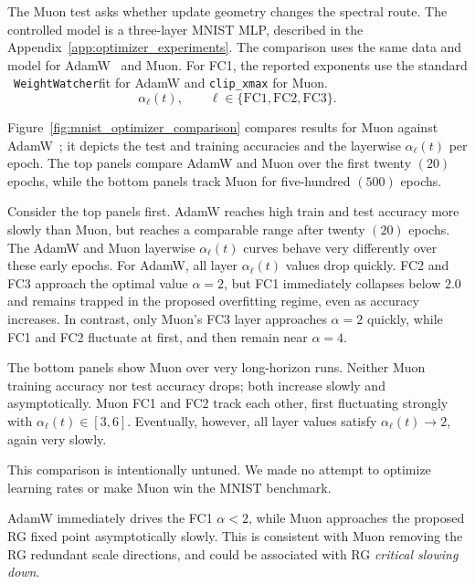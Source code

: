\documentclass[10pt,twocolumn]{article}
\newcommand{\WW}{\texttt{WeightWatcher}}
\begin{document}
The Muon test asks whether update geometry changes the spectral route.  The controlled model is a three-layer MNIST MLP, described
in the Appendix~\ref{app:optimizer_experiments}.
The comparison uses the same data and model for AdamW~\cite{LoshchilovHutter2019} and Muon.
For FC1, the reported exponents use the standard ~\WW fit for AdamW and \texttt{clip\_xmax} for Muon.
\begin{equation}
        \alpha_\ell(t),
        \qquad
        \ell\in\{\mathrm{FC1},\mathrm{FC2},\mathrm{FC3}\}.
\end{equation}


Figure~\ref{fig:mnist_optimizer_comparison} compares results for Muon against AdamW~\cite{LoshchilovHutter2019};
it depicts the test and training accuracies and the layerwise $\alpha_{\ell}(t)$ per epoch.
The top panels compare AdamW and Muon over the first twenty $(20)$ epochs, while the bottom panels
track Muon for five-hundred $(500)$ epochs.

Consider the top panels first.
AdamW reaches high train and test accuracy more slowly than Muon, but reaches a comparable range after twenty $(20)$ epochs.
The AdamW and Muon layerwise $\alpha_\ell(t)$ curves behave very differently over these early epochs.
For AdamW, all layer $\alpha_\ell(t)$ values drop quickly. FC2 and FC3 approach the optimal value $\alpha=2$,
but FC1 immediately collapses below $2.0$ and remains trapped in the proposed overfitting regime, even as accuracy increases.
In contrast, only Muon's FC3 layer approaches $\alpha=2$ quickly,
while FC1 and FC2 fluctuate at first, and then remain near $\alpha=4$.

The bottom panels show Muon over very long-horizon runs.
Neither Muon training accuracy nor test accuracy drops; both increase slowly and asymptotically.
Muon FC1 and FC2 track each other, first fluctuating strongly with $\alpha_\ell(t)\in[3,6]$.
Eventually, however, all layer values satisfy $\alpha_\ell(t)\rightarrow 2$, again very slowly.

This comparison is intentionally untuned. We made no attempt to optimize learning rates or make Muon win the MNIST benchmark.

AdamW immediately drives the FC1 $\alpha<2$, while Muon approaches the proposed RG fixed  point
asymptotically slowly.  This is consistent with Muon removing the
 RG redundant scale directions, and could be associated with RG \emph{critical slowing down}.
\clearpage
\newpage
\end{document}
